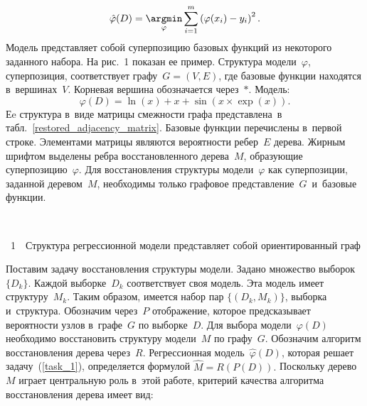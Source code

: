 \begin{multicols}{2}
\noindent
\begin{equation}
\hat{\varphi}(D)=\mathop{\argmin}\limits_\varphi\sum\limits_{i=1}^m\left(\varphi(x_i)-
y_i\right)^2.
\label{task_1}
\end{equation}
Модель представляет собой суперпозицию базовых функций из некоторого заданного 
набора. На рис.~1 показан ее пример. Структура модели~$\varphi$, 
суперпозиция, соответствует графу~$G=(V,E)$, где базовые функции находятся 
в~вершинах~$V$. {Корневая} вершина обозначается через~$\ast$. Модель:
$$
\varphi(D) =  \ln(x) + x + \sin\left( x\times \exp(x)\right).
$$
 Еe структура в~виде матрицы 
смежности графа пред\-став\-ле\-на~в табл.~\ref{restored_adjacency_matrix}.
Базовые функции перечислены в~первой строке. Элементами матрицы являются 
вероятности ребер~$E$ дерева. Жир\-ным шриф\-том выделены ребра восстановленного 
дерева~$M$, образующие суперпозицию~$\varphi$. Для восстановления структуры 
модели~$\varphi$ как суперпозиции, заданной деревом~$M$, необходимы только 
графовое пред\-став\-ле\-ние~$G$~и~базовые функции.

{ \begin{center}  %
 \vspace*{6pt}
    \mbox{%
\epsfxsize=37.447mm
}

\end{center}



\noindent
{{\figurename~1}\ \ \small{Структура регрессионной модели представляет собой ориентированный 
граф
}}}


\addtocounter{figure}{1}





Поставим задачу восстановления структуры модели. Задано множество 
выборок~$\{D_k\}$. Каждой выборке~$D_k$ соответствует своя модель. Эта модель 
имеет структуру~$M_k$. Таким образом, имеется набор пар $\{(D_k, M_k)\}$, 
выборка и~структура.
Обозначим через~$P$ отображение, которое предсказывает вероятности узлов 
в~графе~$G$ по выборке~$D$. Для выбора модели~$\varphi(D)$ необходимо восстановить 
структуру модели~$M$ по графу~$G$. Обозначим алгоритм восстановления дерева 
через~$R$. Регрессионная модель~$\hat{\varphi}(D)$, которая решает 
задачу~(\ref{task_1}), определяется формулой
$
\hat{M}=R\left(P(D)\right).
$
Поскольку дерево~$M$ играет центральную роль в~этой работе, критерий качества 
алгоритма восстановления дерева имеет вид:



\end{multicols}
